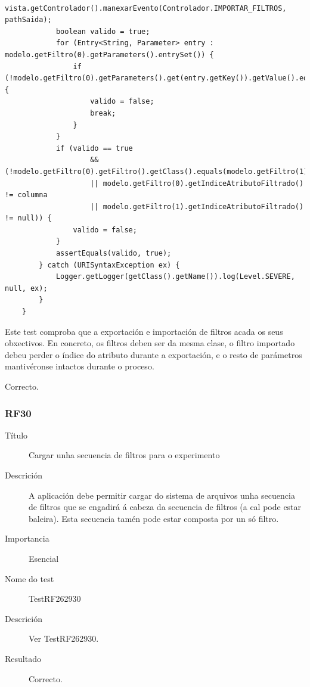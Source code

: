 \begin{description}
\begin{lstlisting}
            vista.getControlador().manexarEvento(Controlador.IMPORTAR_FILTROS, pathSaida);
            boolean valido = true;
            for (Entry<String, Parameter> entry : modelo.getFiltro(0).getParameters().entrySet()) {
                if (!modelo.getFiltro(0).getParameters().get(entry.getKey()).getValue().equals(modelo.getFiltro(1).getParameters().get(entry.getKey()).getValue())) {
                    valido = false;
                    break;
                }
            }
            if (valido == true
                    && (!modelo.getFiltro(0).getFiltro().getClass().equals(modelo.getFiltro(1).getFiltro().getClass())
                    || modelo.getFiltro(0).getIndiceAtributoFiltrado() != columna
                    || modelo.getFiltro(1).getIndiceAtributoFiltrado() != null)) {
                valido = false;
            }
            assertEquals(valido, true);
        } catch (URISyntaxException ex) {
            Logger.getLogger(getClass().getName()).log(Level.SEVERE, null, ex);
        }
    }
\end{lstlisting}
\item[Descrición]
Este test comproba que a exportación e importación de filtros acada os seus obxectivos. En concreto, os filtros deben ser da mesma clase, o filtro importado debeu perder o índice do atributo durante a exportación, e o resto de parámetros mantivéronse intactos durante o proceso.
\item[Resultado]
Correcto.
\end{description}

\subsubsection*{RF30}
\begin{description}
\item[Título] \hfill
Cargar unha secuencia de filtros para o experimento
\item[Descrición] \hfill
A aplicación debe permitir cargar do sistema de arquivos unha secuencia de filtros que se engadirá á cabeza da secuencia de filtros (a cal pode estar baleira). Esta secuencia tamén pode estar composta por un só filtro.
\item[Importancia] \hfill
Esencial
\item[Nome do test] \hfill
TestRF262930
\item[Descrición]
Ver TestRF262930.
\item[Resultado]
Correcto.
\end{description}

